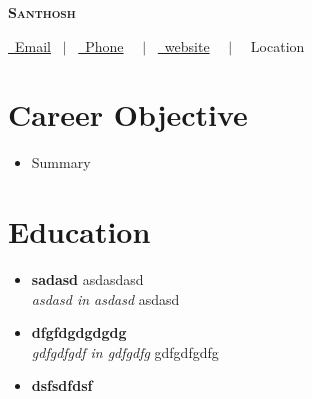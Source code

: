 \documentclass[letterpaper,5pt]{article}
\begin{document}
    
    \begin{center}
      \textbf{\Huge \scshape Santhosh} \\ \vspace{5pt}
      
      \href{mailto:Email}{\raisebox{-0.05\height}\faEnvelope \ Email} 
      \ $|$ \ \href{tel:Phone}{\raisebox{-0.05\height}\faMobile \ Phone}  \
      \ $|$ \ \href{website}{\raisebox{-0.05\height}\faGlobe \ website}  \
      \ $|$ \ {\raisebox{-0.05\height}\faMapMarker \ Location} \ \
    \end{center}
    
      \section{Career Objective}
        \begin{itemize}[leftmargin=0.15in, label={}]
          \item{Summary}
        \end{itemize}
    
    \section{Education}
      
      
        \begin{itemize}[leftmargin=0.15in, label={}]
        \item[]
          \textbf{ sadasd } \hfill asdasdasd \\
          \textit{ asdasd in asdasd } \hfill asdasd 
        \end{itemize}
        \vspace{-15pt}
      
        \begin{itemize}[leftmargin=0.15in, label={}]
        \item[]
          \textbf{ dfgfdgdgdgdg } \hfill  \\
          \textit{ gdfgdfgdf in gdfgdfg } \hfill gdfgdfgdfg 
        \end{itemize}
        \vspace{-15pt}
      
        \begin{itemize}[leftmargin=0.15in, label={}]
        \item[]
          \textbf{ dsfsdfdsf } \hfill  \\
          \textit{    } \hfill  
        \end{itemize}
        \vspace{-15pt}
      
\end{document}
